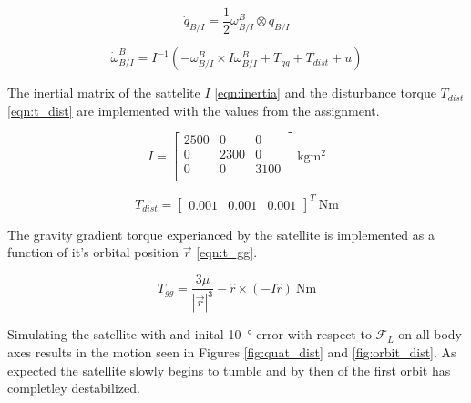 \documentclass{article}
\begin{document}
\begin{equation}
	\dot{q}_{B/I} = \frac{1}{2} \omega_{B/I}^B \otimes q_{B/I}
	\label{eqn:kin_sat}
\end{equation}

\begin{equation}
	\dot{\omega}_{B/I}^{B} = I^{-1} \left(-\omega_{B/I}^B \times I\omega_{B/I}^B + T_{gg} + T_{dist} + u\right)
	\label{eqn:dyn_sat}
\end{equation}

The inertial matrix of the sattelite $I$ \ref{eqn:inertia} and the disturbance torque $T_{dist}$ \ref{eqn:t_dist} are implemented with the values from the assignment.

\begin{equation}
	I = \left[\begin{matrix}
		2500 & 0    & 0 \\
		0    & 2300 & 0 \\
		0    & 0    & 3100 \\
	\end{matrix}\right] \SI{}{\kilogram\meter^2}
	\label{eqn:inertia}
\end{equation}

\begin{equation}
	T_{dist} = \left[\begin{matrix}
		0.001 & 0.001 & 0.001
	\end{matrix}\right]^T \SI{}{\newton\meter}
	\label{eqn:t_dist}
\end{equation}

The gravity gradient torque experianced by the satellite is implemented as a function of it's orbital position $\vec{r}$ \ref{eqn:t_gg}.

\begin{equation}
	T_{gg} = \frac{3\mu}{|\vec{r}|^3} -\hat{r} \times (-I\hat{r}) \SI{}{\newton\meter}
	\label{eqn:t_gg}
\end{equation}

Simulating the satellite with and inital \SI{10}{\degree} error with respect to $\mathcal{F}_L$ on all body axes results in the motion seen in Figures \ref{fig:quat_dist} and \ref{fig:orbit_dist}. As expected the satellite slowly begins to tumble and by then of the first orbit has completley destabilized.
\end{document}

